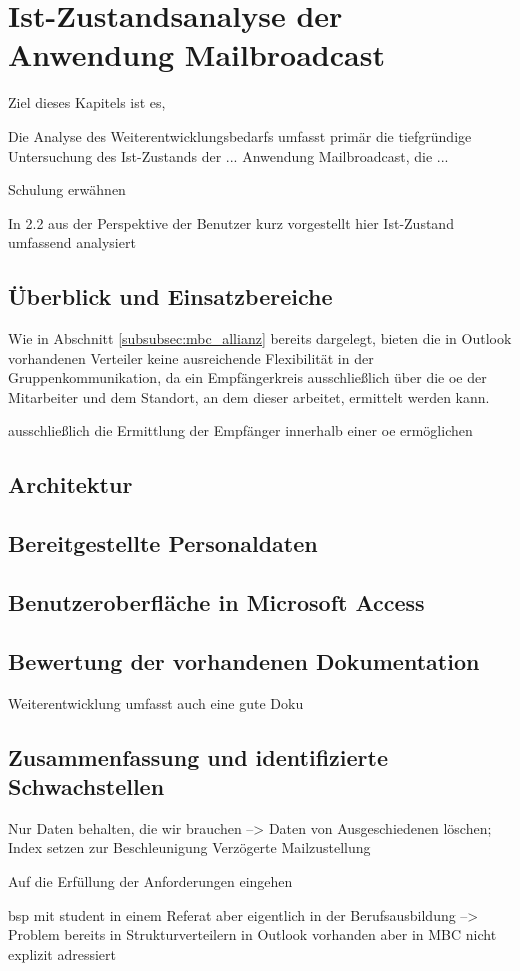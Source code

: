 \section{Ist-Zustandsanalyse der Anwendung Mailbroadcast}
\label{sec:ist_zustand}
Ziel dieses Kapitels ist es, 

Die Analyse des Weiterentwicklungsbedarfs umfasst primär die tiefgründige Untersuchung des Ist-Zustands der ... Anwendung Mailbroadcast, die ...

Schulung erwähnen

In 2.2 aus der Perspektive der Benutzer kurz vorgestellt hier Ist-Zustand umfassend analysiert


\subsection{Überblick und Einsatzbereiche}
Wie in Abschnitt \ref{subsubsec:mbc_allianz} bereits dargelegt, bieten die in Outlook vorhandenen Verteiler keine ausreichende
Flexibilität in der Gruppenkommunikation, da ein Empfängerkreis ausschließlich über die \gls{oe} der Mitarbeiter und dem
Standort, an dem dieser arbeitet, ermittelt werden kann.

ausschließlich die Ermittlung der Empfänger innerhalb einer
\gls{oe} ermöglichen


\cite{mbcSchulung}

\subsection{Architektur}
\subsection{Bereitgestellte Personaldaten}
\subsection{Benutzeroberfläche in Microsoft Access}
\subsection{Bewertung der vorhandenen Dokumentation}
Weiterentwicklung umfasst auch eine gute Doku
\subsection{Zusammenfassung und identifizierte Schwachstellen}
Nur Daten behalten, die wir brauchen --> Daten von Ausgeschiedenen löschen; Index setzen zur Beschleunigung
Verzögerte Mailzustellung

Auf die Erfüllung der Anforderungen eingehen

bsp mit student in einem Referat aber eigentlich in der Berufsausbildung --> Problem bereits in Strukturverteilern in Outlook vorhanden
aber in MBC nicht explizit adressiert